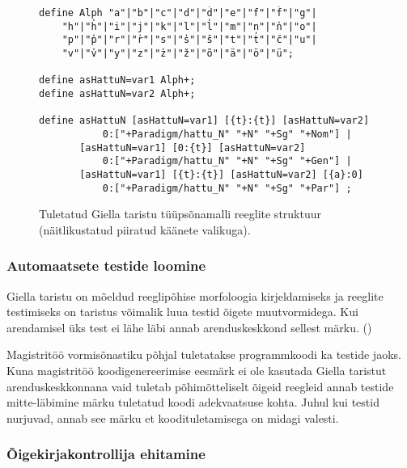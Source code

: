 \documentclass[12pt,a4paper]{article}
\begin{document}
\begin{figure}[H]
  \center
  \begin{verbatim}
define Alph "a"|"b"|"c"|"d"|"d̕"|"e"|"f"|"f̕"|"g"|
    "h"|"h̕"|"i"|"j"|"k"|"l"|"l̕"|"m"|"n"|"n̕"|"o"|
    "p"|"p̕"|"r"|"r̕"|"s"|"s̕"|"š"|"t"|"t̕"|"č"|"u"|
    "v"|"v̕"|"y"|"z"|"z̕"|"ž"|"õ"|"ä"|"ö"|"ü";

define asHattuN=var1 Alph+;
define asHattuN=var2 Alph+;

define asHattuN [asHattuN=var1] [{t}:{t}] [asHattuN=var2]
           0:["+Paradigm/hattu_N" "+N" "+Sg" "+Nom"] |
       [asHattuN=var1] [0:{t}] [asHattuN=var2]
           0:["+Paradigm/hattu_N" "+N" "+Sg" "+Gen"] |
       [asHattuN=var1] [{t}:{t}] [asHattuN=var2] [{a}:0]
           0:["+Paradigm/hattu_N" "+N" "+Sg" "+Par"] ;
\end{verbatim}
\caption{Tuletatud Giella taristu tüüpsõnamalli reeglite struktuur (näitlikustatud piiratud käänete valikuga).
  \label{code:giella-paradigms}}
\end{figure}



\subsubsection{Automaatsete testide loomine}
\label{sec:giella-testid}

Giella taristu on mõeldud reeglipõhise morfoloogia kirjeldamiseks ja reeglite testimiseks on taristus võimalik luua testid õigete muutvormidega. Kui arendamisel üks test ei lähe läbi annab arendus\-keskkond sellest märku. (\cite[347]{moshagen_building_2013}) %

Magistritöö vormisõnastiku põhjal tuletatakse programm\-koodi ka testide jaoks. Kuna magistritöö koodi\-genereerimise eesmärk ei ole kasutada Giella taristut arendus\-keskkonnana vaid tuletab põhimõtteliselt õigeid reegleid annab testide mitte-läbimine märku tuletatud koodi adekvaatsuse kohta. Juhul kui testid nurjuvad, annab see märku et koodi\-tuletamisega on midagi valesti.

\subsubsection{Õigekirjakontrollija ehitamine}
\label{sec:giella-õigekirjakontrollija}
\end{document}
